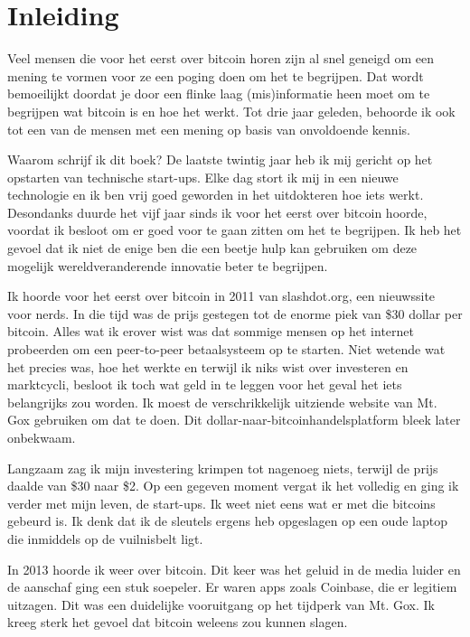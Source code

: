 \chapter{Inleiding}

Veel mensen die voor het eerst over bitcoin horen zijn al snel geneigd om een mening te vormen voor ze een poging doen om het te begrijpen. Dat wordt bemoeilijkt doordat je door een flinke laag (mis)informatie heen moet om te begrijpen wat bitcoin is en hoe het werkt. Tot drie jaar geleden, behoorde ik ook tot een van de mensen met een mening op basis van onvoldoende kennis.

Waarom schrijf ik dit boek? De laatste twintig jaar heb ik mij gericht op het opstarten van technische start-ups. Elke dag stort ik mij in een nieuwe technologie en ik ben vrij goed geworden in het uitdokteren hoe iets werkt. Desondanks duurde het vijf jaar sinds ik voor het eerst over bitcoin hoorde, voordat ik besloot om er goed voor te gaan zitten om het te begrijpen. Ik heb het gevoel dat ik niet de enige ben die een beetje hulp kan gebruiken om deze mogelijk wereldveranderende innovatie beter te begrijpen.

Ik hoorde voor het eerst over bitcoin in 2011 van \mbox{slashdot.org}, een nieuwssite voor nerds. In die tijd was de prijs gestegen tot de enorme piek van \$30 dollar per bitcoin. Alles wat ik erover wist was dat sommige mensen op het internet probeerden om een peer-to-peer betaalsysteem op te starten. Niet wetende wat het precies was, hoe het werkte en terwijl ik niks wist over investeren en marktcycli, besloot ik toch wat geld in te leggen voor het geval het iets belangrijks zou worden. Ik moest de verschrikkelijk uitziende website van Mt. Gox gebruiken om dat te doen. Dit dollar-naar-bitcoinhandelsplatform bleek later onbekwaam.

Langzaam zag ik mijn investering krimpen tot nagenoeg niets, terwijl de prijs daalde van \$30 naar \$2. Op een gegeven moment vergat ik het volledig en ging ik verder met mijn leven, de start-ups. Ik weet niet eens wat er met die bitcoins gebeurd is. Ik denk dat ik de sleutels ergens heb opgeslagen op een oude laptop die inmiddels op de vuilnisbelt ligt.

In 2013 hoorde ik weer over bitcoin. Dit keer was het geluid in de media luider en de aanschaf ging een stuk soepeler. Er waren apps zoals Coinbase, die er legitiem uitzagen. Dit was een duidelijke vooruitgang op het tijdperk van Mt. Gox. Ik kreeg sterk het gevoel dat bitcoin weleens zou kunnen slagen.


